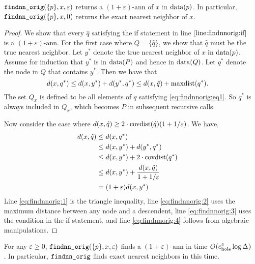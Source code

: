 \documentclass[thesis.tex]{subfiles}
\newcommand{\dist}[2]{\distf({#1},{#2})}
\newcommand{\distf}{d}
\newcommand{\aspect}[1]{\Delta_{#1}}
\newcommand{\cdoub}{c_\textnormal{doub}}
\newcommand{\chole}{c_\textnormal{hole}}
\newcommand{\eann}{(1+\varepsilon)\text{-ann}}
\newcommand{\mkfunction}[1]{\ifmmode{\textnormal{{#1}}}}
\newcommand{\covdist}[1]    {\mkfunction{covdist}({#1})}
\newcommand{\maxdist}[1]    {\mkfunction{maxdist}({#1})}
\newcommand{\data}[1]       {\mkfunction{data}({#1})}
\newcommand{\mkprocedure}[1]{\textnormal{\ttfamily {#1}}}
\newcommand{\findnnorig}{\mkprocedure{findnn\_orig}}
\begin{document}
\begin{theorem}
    \label{theorem:findnnorig:correct}
    $\findnnorig(\{p\}, x, \varepsilon)$ returns a $\eann$ of $x$ in $\data{p}$.
    In particular, $\findnnorig(\{p\},x,0)$ returns the exact nearest neighbor of $x$.
\end{theorem}
\begin{proof}
    We show that every $\hat q$ satisfying the if statement in line $\ref{line:findnnorig:if}$ is a $\eann$.
    For the first case where $Q=\{\hat q\}$, 
    we show that $\hat q$ must be the true nearest neighbor.
    Let $y^*$ denote the true nearest neighbor of $x$ in $\data{p}$.
    Assume for induction that $y^*$ is in $\data{P}$ and hence in $\data{Q}$.
    Let $q^*$ denote the node in $Q$ that contains $y^*$.
    Then we have that
    \begin{equation}
        \label{eq:findnnorig:eq1}
        \dist{x}{q^*}
        \le \dist{x}{y^*} + \dist{y^*}{q^*}
        \le \dist{x}{\hat q} + \maxdist{q^*}
        .
    \end{equation}
    The set $Q_x$ is defined to be all elements of $q$ satisfying \eqref{eq:findnnorig:eq1}.
    So $q^*$ is always included in $Q_x$,
    which becomes $P$ in subsequent recursive calls.

    Now consider the case where $\dist{x}{\hat q} \ge 2\cdot\covdist{\hat q}(1+1/\varepsilon)$.
    We have,
    \begin{align}
        \dist{x}{\hat q}
        &\le \dist{x}{q^*}
        \\&\le \dist{x}{y^*} + \dist{y^*}{q^*}
        \label{eq:findnnorig:1}
        \\
        &\le \dist{x}{y^*} + 2\cdot\covdist{q^*}
        \label{eq:findnnorig:2}
        \\
        &\le \dist{x}{y^*} + \frac{\dist{x}{\hat q}}{1+1/\varepsilon}
        \label{eq:findnnorig:3}
        \\
        &= (1+\varepsilon)\dist{x}{y^*}
        \label{eq:findnnorig:4}
    \end{align}
    Line \eqref{eq:findnnorig:1} is the triangle inequality,
    line \eqref{eq:findnnorig:2} uses the maximum distance between any node and a descendent,
    line \eqref{eq:findnnorig:3} uses the condition in the if statement,
    and line \eqref{eq:findnnorig:4} follows from algebraic manipulations.
\end{proof}

\begin{theorem}
    \label{theorem:findnnorig:runtime:approx}
    For any $\varepsilon\ge0$, $\findnnorig(\{p\},x,\varepsilon)$ finds a $\eann$ in time $O(\chole^4\log\aspect{})$.
    In particular, $\findnnorig$ finds exact nearest neighbors in this time.
\end{theorem}
\end{document}
